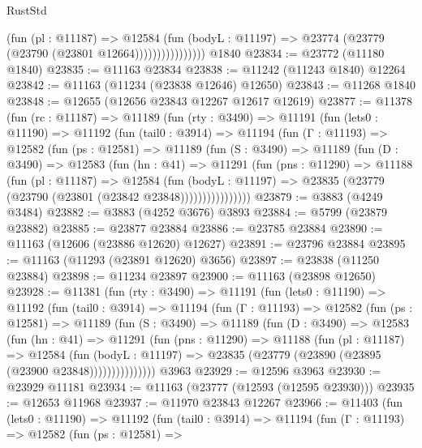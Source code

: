 \begin{lexlean}{RustStd}
\begin{coremodule}
                          (fun (pl : @11187) =>
                          @12584
                            (fun (bodyL : @11197) =>
                            @23774 (@23779 (@23790 (@23801 @12664))))))))))))))))
    @1840
@23834 := @23772 (@11180 @1840)
@23835 := @11163 @23834
@23838 := @11242 (@11243 @1840) @12264
@23842 := @11163 (@11234 (@23838 @12646) @12650)
@23843 := @11268 @1840
@23848 := @12655 (@12656 @23843 @12267 @12617 @12619)
@23877 := @11378
    (fun (rc : @11187) =>
    @11189
      (fun (rty : @3490) =>
      @11191
        (fun (lets0 : @11190) =>
        @11192
          (fun (tail0 : @3914) =>
          @11194
            (fun (Γ : @11193) =>
            @12582
              (fun (ps : @12581) =>
              @11189
                (fun (S : @3490) =>
                @11189
                  (fun (D : @3490) =>
                  @12583
                    (fun (hn : @41) =>
                    @11291
                      (fun (pns : @11290) =>
                      @11188
                        (fun (pl : @11187) =>
                        @12584
                          (fun (bodyL : @11197) =>
                          @23835 (@23779 (@23790 (@23801 (@23842 @23848))))))))))))))))
@23879 := @3883 (@4249 @3484)
@23882 := @3883 (@4252 @3676) @3893
@23884 := @5799 (@23879 @23882)
@23885 := @23877 @23884
@23886 := @23785 @23884
@23890 := @11163 (@12606 (@23886 @12620) @12627)
@23891 := @23796 @23884
@23895 := @11163 (@11293 (@23891 @12620) @3656)
@23897 := @23838 (@11250 @23884)
@23898 := @11234 @23897
@23900 := @11163 (@23898 @12650)
@23928 := @11381
    (fun (rty : @3490) =>
    @11191
      (fun (lets0 : @11190) =>
      @11192
        (fun (tail0 : @3914) =>
        @11194
          (fun (Γ : @11193) =>
          @12582
            (fun (ps : @12581) =>
            @11189
              (fun (S : @3490) =>
              @11189
                (fun (D : @3490) =>
                @12583
                  (fun (hn : @41) =>
                  @11291
                    (fun (pns : @11290) =>
                    @11188
                      (fun (pl : @11187) =>
                      @12584
                        (fun (bodyL : @11197) =>
                        @23835 (@23779 (@23890 (@23895 (@23900 @23848)))))))))))))))
    @3963
@23929 := @12596 @3963
@23930 := @23929 @11181
@23934 := @11163 (@23777 (@12593 (@12595 @23930)))
@23935 := @12653 @11968
@23937 := @11970 @23843 @12267
@23966 := @11403
    (fun (lets0 : @11190) =>
    @11192
      (fun (tail0 : @3914) =>
      @11194
        (fun (Γ : @11193) =>
        @12582
          (fun (ps : @12581) =>

\end{coremodule}
\end{lexlean}
